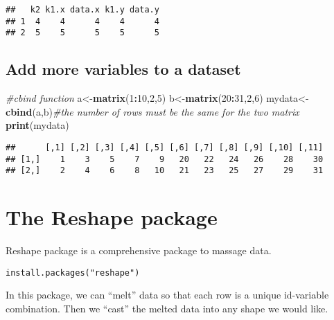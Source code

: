 \documentclass[]{book}
\newenvironment{Shaded}{\begin{snugshade}}{\end{snugshade}}
\newcommand{\KeywordTok}[1]{\textcolor[rgb]{0.13,0.29,0.53}{\textbf{#1}}}
\newcommand{\DecValTok}[1]{\textcolor[rgb]{0.00,0.00,0.81}{#1}}
\newcommand{\CommentTok}[1]{\textcolor[rgb]{0.56,0.35,0.01}{\textit{#1}}}
\newcommand{\OperatorTok}[1]{\textcolor[rgb]{0.81,0.36,0.00}{\textbf{#1}}}
\newcommand{\NormalTok}[1]{#1}
\theoremstyle{definition}
\theoremstyle{definition}
\theoremstyle{definition}
\theoremstyle{remark}
\begin{document}
\begin{verbatim}
##   k2 k1.x data.x k1.y data.y
## 1  4    4      4    4      4
## 2  5    5      5    5      5
\end{verbatim}

\subsection{Add more variables to a
dataset}\label{add-more-variables-to-a-dataset}

\begin{Shaded}
\begin{Highlighting}[]
\CommentTok{#cbind function}
\NormalTok{a<-}\KeywordTok{matrix}\NormalTok{(}\DecValTok{1}\OperatorTok{:}\DecValTok{10}\NormalTok{,}\DecValTok{2}\NormalTok{,}\DecValTok{5}\NormalTok{)}
\NormalTok{b<-}\KeywordTok{matrix}\NormalTok{(}\DecValTok{20}\OperatorTok{:}\DecValTok{31}\NormalTok{,}\DecValTok{2}\NormalTok{,}\DecValTok{6}\NormalTok{)}
\NormalTok{mydata<-}\KeywordTok{cbind}\NormalTok{(a,b)}\CommentTok{#the number of rows must be the same for the two matrix}
\KeywordTok{print}\NormalTok{(mydata)}
\end{Highlighting}
\end{Shaded}

\begin{verbatim}
##      [,1] [,2] [,3] [,4] [,5] [,6] [,7] [,8] [,9] [,10] [,11]
## [1,]    1    3    5    7    9   20   22   24   26    28    30
## [2,]    2    4    6    8   10   21   23   25   27    29    31
\end{verbatim}

\section{The Reshape package}\label{the-reshape-package}

Reshape package is a comprehensive package to massage data.

\begin{verbatim}
install.packages("reshape")
\end{verbatim}

In this package, we can ``melt'' data so that each row is a unique
id-variable combination. Then we ``cast'' the melted data into any shape
we would like.
\end{document}
